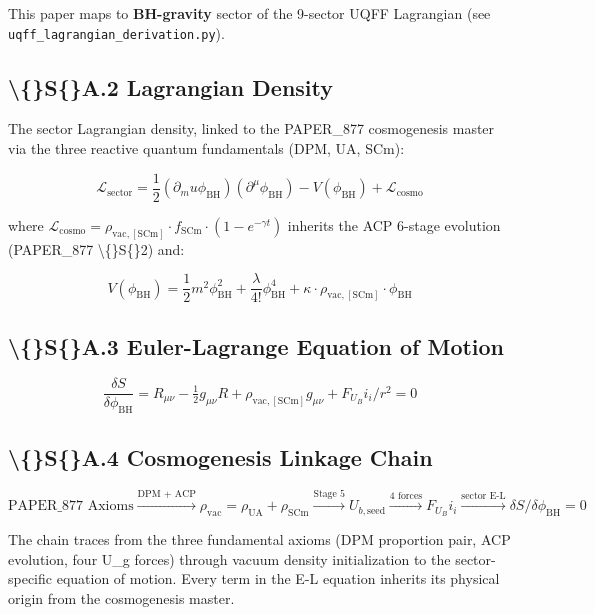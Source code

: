 \documentclass[11pt]{article}
\begin{document}
This paper maps to \textbf{BH-gravity} sector of the 9-sector UQFF Lagrangian (see \verb|uqff_lagrangian_derivation.py|).

\subsection*{\textbackslash\{\}S\{\}A.2 Lagrangian Density}

The sector Lagrangian density, linked to the PAPER\_877 cosmogenesis master via the three reactive quantum fundamentals (DPM, UA, SCm):

$$\mathcal{L}_{\mathrm{sector}} = \frac{1}{2}(\partial_mu \phi_{\mathrm{BH}})(\partial^\mu \phi_{\mathrm{BH}}) - V(\phi_{\mathrm{BH}}) + \mathcal{L}_{\mathrm{cosmo}}$$

where $\mathcal{L}_{\mathrm{cosmo}} = \rho_{\mathrm{vac,[SCm]}} \cdot f_{\mathrm{SCm}} \cdot (1 - e^{-\gamma t})$ inherits the ACP 6-stage evolution (PAPER\_877 \textbackslash\{\}S\{\}2) and:

$$V(\phi_{\mathrm{BH}}) = \frac{1}{2} m^2 \phi_{\mathrm{BH}}^2 + \frac{\lambda}{4!} \phi_{\mathrm{BH}}^4 + \kappa \cdot \rho_{\mathrm{vac,[SCm]}} \cdot \phi_{\mathrm{BH}}$$

\subsection*{\textbackslash\{\}S\{\}A.3 Euler-Lagrange Equation of Motion}

$$\boxed{\frac{\delta S}{\delta \phi_{\mathrm{BH}}} = R_{\mu\nu} - \tfrac{1}{2}g_{\mu\nu}R + \rho_{\mathrm{vac,[SCm]}} g_{\mu\nu} + F_U_Bi_i/r^2 = 0}$$

\subsection*{\textbackslash\{\}S\{\}A.4 Cosmogenesis Linkage Chain}

$$\text{PAPER\_877 Axioms} \xrightarrow{\text{DPM + ACP}} \rho_{\mathrm{vac}} = \rho_{\mathrm{UA}} + \rho_{\mathrm{SCm}} \xrightarrow{\text{Stage 5}} U_{b,\mathrm{seed}} \xrightarrow{\text{4 forces}} F_U_Bi_i \xrightarrow{\text{sector E-L}} \delta S/\delta \phi_{\mathrm{BH}} = 0$$

The chain traces from the three fundamental axioms (DPM proportion pair, ACP evolution, four U\_g forces) through vacuum density initialization to the sector-specific equation of motion. Every term in the E-L equation inherits its physical origin from the cosmogenesis master.
\end{document}
